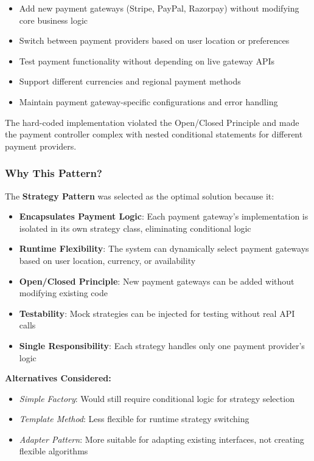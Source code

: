 \documentclass[a4paper,12pt]{report}
\begin{document}
\begin{itemize}
    \item Add new payment gateways (Stripe, PayPal, Razorpay) without modifying core business logic
    \item Switch between payment providers based on user location or preferences
    \item Test payment functionality without depending on live gateway APIs
    \item Support different currencies and regional payment methods
    \item Maintain payment gateway-specific configurations and error handling
\end{itemize}

The hard-coded implementation violated the Open/Closed Principle and made the payment controller complex with nested conditional statements for different payment providers.

\subsubsection{Why This Pattern?}

The \textbf{Strategy Pattern} was selected as the optimal solution because it:

\begin{itemize}
    \item \textbf{Encapsulates Payment Logic}: Each payment gateway's implementation is isolated in its own strategy class, eliminating conditional logic
    \item \textbf{Runtime Flexibility}: The system can dynamically select payment gateways based on user location, currency, or availability
    \item \textbf{Open/Closed Principle}: New payment gateways can be added without modifying existing code
    \item \textbf{Testability}: Mock strategies can be injected for testing without real API calls
    \item \textbf{Single Responsibility}: Each strategy handles only one payment provider's logic
\end{itemize}

\textbf{Alternatives Considered:}
\begin{itemize}
    \item \textit{Simple Factory}: Would still require conditional logic for strategy selection
    \item \textit{Template Method}: Less flexible for runtime strategy switching
    \item \textit{Adapter Pattern}: More suitable for adapting existing interfaces, not creating flexible algorithms
\end{itemize}
\end{document}
